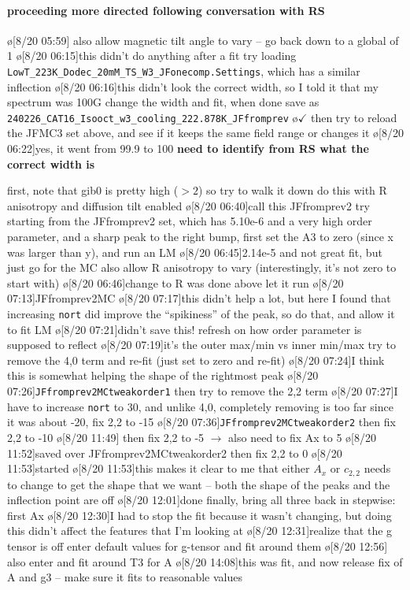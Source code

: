 \paragraph{proceeding more directed following conversation with RS}
\o[8/20 05:59]{}
also allow magnetic tilt angle to vary -- go back down to a global of 1
\o[8/20 06:15]{this didn't do anything after a fit}
try loading \texttt{LowT_223K_Dodec_20mM_TS_W3_JFonecomp.Settings}, which has a similar inflection
\o[8/20 06:16]{this didn't look the correct width, so I told it that my spectrum was 100G}
change the width and fit,
when done save as
\texttt{240226_CAT16_Isooct_w3_cooling_222.878K_JFfromprev}
\o{$\checkmark$}
then try to reload the JFMC3 set above, and see if it keeps the same field range or changes it
\o[8/20 06:22]{yes, it went from 99.9 to 100}
\textbf{need to identify from RS what the correct width is}

first, note that gib0 is pretty high ($>2$) so try to walk it down
do this with R anisotropy and diffusion tilt enabled
\o[8/20 06:40]{call this JFfromprev2}
try starting from the JFfromprev2 set, which has 5.10e-6 and a very high order parameter,
and a sharp peak to the right bump,
first set the A3 to zero (since x was larger than y), and run an LM
\o[8/20 06:45]{2.14e-5 and not great fit, but}
just go for the MC
also allow R anisotropy to vary (interestingly, it's not zero to start with)
\o[8/20 06:46]{change to R was done above}
let it run
\o[8/20 07:13]{JFfromprev2MC}
\o[8/20 07:17]{this didn't help a lot, but here I found that increasing \texttt{nort} did improve the ``spikiness'' of the peak, so}
do that, and allow it to fit LM
\o[8/20 07:21]{didn't save this!}
refresh on how order parameter is supposed to reflect
\o[8/20 07:19]{it's the outer max/min vs inner min/max}
try to remove the 4,0 term and re-fit (just set to zero and re-fit)
\o[8/20 07:24]{I think this is somewhat helping the shape of the rightmost peak}
\o[8/20 07:26]{\texttt{JFfromprev2MCtweakorder1}}
then try to remove the 2,2 term
\o[8/20 07:27]{I have to increase \texttt{nort} to 30, and unlike 4,0, completely removing is too far}
since it was about -20, fix 2,2 to -15
\o[8/20 07:36]{\texttt{JFfromprev2MCtweakorder2}}
then fix 2,2 to -10
\o[8/20 11:49]{}
then fix 2,2 to -5 $\rightarrow$ also need to fix Ax to 5
\o[8/20 11:52]{saved over JFfromprev2MCtweakorder2}
then fix 2,2 to 0
\o[8/20 11:53]{started}
\o[8/20 11:53]{this makes it clear to me that either $A_x$ or $c_{2,2}$ needs to change to get the shape that we want -- both the shape of the peaks and the inflection point are off}
\o[8/20 12:01]{done}
finally, bring all three back in stepwise:
first Ax
\o[8/20 12:30]{I had to stop the fit because it wasn't changing, but doing this didn't affect the features that I'm looking at}
\o[8/20 12:31]{realize that the g tensor is off}
enter default values for g-tensor and fit around them
\o[8/20 12:56]{}
also enter and fit around T3 for A
\o[8/20 14:08]{this was fit, and now}
release fix of A and g3 -- make sure it fits to reasonable values

